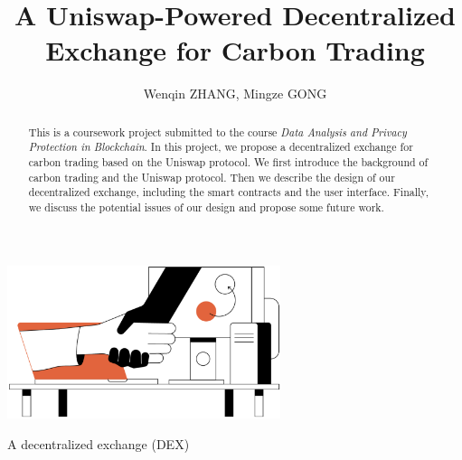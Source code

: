 \documentclass[sigconf, authordraft]{acmart}
\begin{document}
	\title{A Uniswap-Powered Decentralized Exchange for Carbon Trading}


	\author{Wenqin ZHANG, Mingze GONG}


	\renewcommand{\shortauthors}{Trovato and Tobin, et al.}


	\begin{abstract}
		This is a coursework project submitted to the course \textit{Data Analysis and Privacy Protection in Blockchain}. In this project, we propose a decentralized exchange for carbon trading based on the Uniswap protocol. We first introduce the background of carbon trading and the Uniswap protocol. Then we describe the design of our decentralized exchange, including the smart contracts and the user interface. Finally, we discuss the potential issues of our design and propose some future work.
	\end{abstract}



	\begin{teaserfigure}
		\centering\includegraphics[width=0.6\textwidth]{assets/Gemini-What_Is_a_Decentralized_Exchange__DEX__.png}
		\caption{A decentralized exchange (DEX)}
		\label{fig: DEX}
	\end{teaserfigure}
\end{document}
